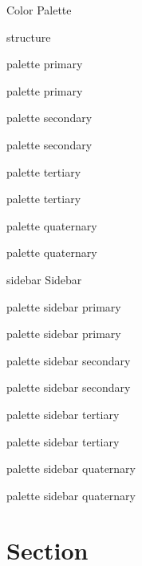 \documentclass[titlebar,fancyfoot,11pt,qrcode]{khbeamer}
\begin{document}
\begin{frame}{Color Palette}

\textcolor{structure}{structure}

\begin{minipage}{10em}
	\begin{beamercolorbox}{palette primary}
	\strut palette primary
	\end{beamercolorbox}

	\begin{beamercolorbox}{palette secondary}
	\strut palette secondary
	\end{beamercolorbox}

	\begin{beamercolorbox}{palette tertiary}
	\strut palette tertiary
	\end{beamercolorbox}

	\begin{beamercolorbox}{palette quaternary}
	\strut palette quaternary
	\end{beamercolorbox}
\end{minipage}

\begin{minipage}{12em}
\small
\begin{beamercolorbox}{sidebar}
	Sidebar

	\begin{beamercolorbox}{palette sidebar primary}
	\strut palette sidebar primary
	\end{beamercolorbox}

	\begin{beamercolorbox}{palette sidebar secondary}
	\strut palette sidebar secondary
	\end{beamercolorbox}

	\begin{beamercolorbox}{palette sidebar tertiary}
	\strut palette sidebar tertiary
	\end{beamercolorbox}

	\begin{beamercolorbox}{palette sidebar quaternary}
	\strut palette sidebar quaternary
	\end{beamercolorbox}
\end{beamercolorbox}
\end{minipage}
\end{frame}


\section{Section}
\begin{frame}\sectionpage\end{frame}
\end{document}
